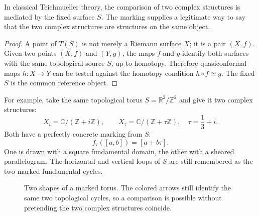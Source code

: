 \begin{proposition}
In classical Teichmueller theory, the comparison of two complex structures is mediated by the fixed surface \(S\).  The marking supplies a legitimate way to say that the two complex structures are structures on the same object.
\end{proposition}

\begin{proof}
A point of \(T(S)\) is not merely a Riemann surface \(X\); it is a pair \((X,f)\).  Given two points \((X,f)\) and \((Y,g)\), the maps \(f\) and \(g\) identify both surfaces with the same topological source \(S\), up to homotopy.  Therefore quasiconformal maps \(h:X\to Y\) can be tested against the homotopy condition \(h\circ f\simeq g\).  The fixed \(S\) is the common reference object.
\end{proof}

For example, take the same topological torus $S=\mathbb R^2/\mathbb Z^2$ and give it two complex structures:
\[
 X_i=\mathbb C/(\mathbb Z+i\mathbb Z),\qquad
 X_{\tau}=\mathbb C/(\mathbb Z+\tau\mathbb Z),
 \quad\tau=\frac13+i.
\]
Both have a perfectly concrete marking from $S$:
\[
 f_\tau([a,b])=[a+b\tau].
\]
One is drawn with a square fundamental domain, the other with a sheared parallelogram. The horizontal and vertical loops of $S$ are still remembered as the two marked fundamental cycles.

\begin{figure}[H]
\centering
{}
\caption{Two shapes of a marked torus. The colored arrows still identify the same two topological cycles, so a comparison is possible without pretending the two complex structures coincide.}
\end{figure}

